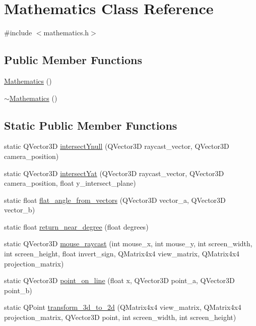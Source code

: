 \hypertarget{class_mathematics}{}\section{Mathematics Class Reference}
\label{class_mathematics}


{\ttfamily \#include $<$mathematics.\+h$>$}

\subsection*{Public Member Functions}
\begin{DoxyCompactItemize}
\item 
\hyperlink{class_mathematics_a2433132eb1adae64e97788d731c7c270}{Mathematics} ()
\item 
\hyperlink{class_mathematics_a812c4f8d2fe0e71a4bc18d0eec7c3bba}{$\sim$\+Mathematics} ()
\end{DoxyCompactItemize}
\subsection*{Static Public Member Functions}
\begin{DoxyCompactItemize}
\item 
static Q\+Vector3\+D \hyperlink{class_mathematics_a37e09805b2d47f832dd9f38f8d10b45e}{intersect\+Ynull} (Q\+Vector3\+D raycast\+\_\+vector, Q\+Vector3\+D camera\+\_\+position)
\item 
static Q\+Vector3\+D \hyperlink{class_mathematics_ace15f5b2079d4277bb21784345b216c9}{intersect\+Yat} (Q\+Vector3\+D raycast\+\_\+vector, Q\+Vector3\+D camera\+\_\+position, float y\+\_\+intersect\+\_\+plane)
\item 
static float \hyperlink{class_mathematics_a6a39d4682e68037c5cf93f2fdc67ff13}{flat\+\_\+angle\+\_\+from\+\_\+vectors} (Q\+Vector3\+D vector\+\_\+a, Q\+Vector3\+D vector\+\_\+b)
\item 
static float \hyperlink{class_mathematics_a918f01968e7c5560b27d1f844ca09917}{return\+\_\+near\+\_\+degree} (float degrees)
\item 
static Q\+Vector3\+D \hyperlink{class_mathematics_aeac802fcbe76f2994fa21a926ff7d232}{mouse\+\_\+raycast} (int mouse\+\_\+x, int mouse\+\_\+y, int screen\+\_\+width, int screen\+\_\+height, float invert\+\_\+sign, Q\+Matrix4x4 view\+\_\+matrix, Q\+Matrix4x4 projection\+\_\+matrix)
\item 
static Q\+Vector3\+D \hyperlink{class_mathematics_a35d4932b3e779a7e6b87b660abefabd4}{point\+\_\+on\+\_\+line} (float x, Q\+Vector3\+D point\+\_\+a, Q\+Vector3\+D point\+\_\+b)
\item 
static Q\+Point \hyperlink{class_mathematics_aabcc7a8f58ad683f815e71af5f1338e8}{transform\+\_\+3d\+\_\+to\+\_\+2d} (Q\+Matrix4x4 view\+\_\+matrix, Q\+Matrix4x4 projection\+\_\+matrix, Q\+Vector3\+D point, int screen\+\_\+width, int screen\+\_\+height)
\end{DoxyCompactItemize}



